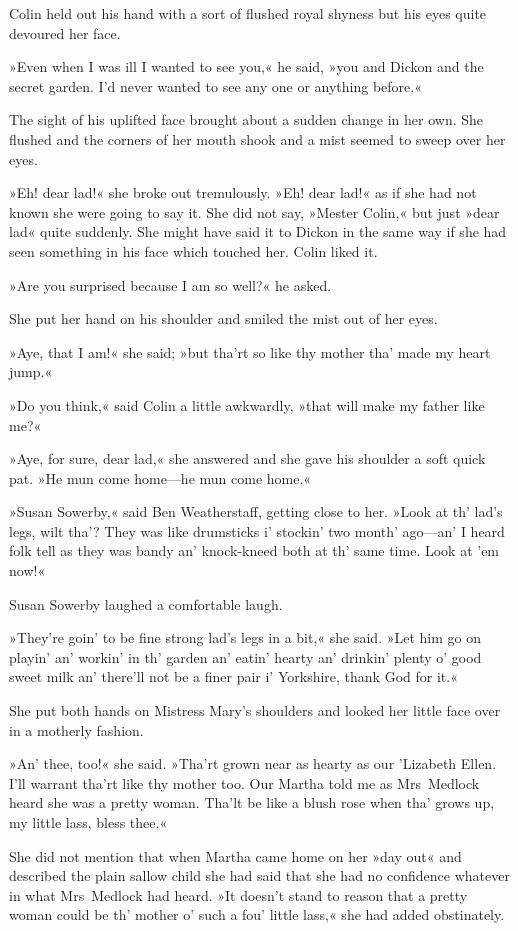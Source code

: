 Colin held out his hand with a sort of flushed royal shyness but his eyes quite devoured her face.

»Even when I was ill I wanted to see you,« he said, »you and Dickon and the secret garden. I'd never wanted to see any one or anything before.«

The sight of his uplifted face brought about a sudden change in her own. She flushed and the corners of her mouth shook and a mist seemed to sweep over her eyes.

»Eh! dear lad!« she broke out tremulously. »Eh! dear lad!« as if she had not known she were going to say it. She did not say, »Mester Colin,« but just »dear lad« quite suddenly. She might have said it to Dickon in the same way if she had seen something in his face which touched her. Colin liked it.

»Are you surprised because I am so well?« he asked.

She put her hand on his shoulder and smiled the mist out of her eyes.

»Aye, that I am!« she said; »but tha'rt so like thy mother tha' made my heart jump.«

»Do you think,« said Colin a little awkwardly, »that will make my father like me?«

»Aye, for sure, dear lad,« she answered and she gave his shoulder a soft quick pat. »He mun come home—he mun come home.«

»Susan Sowerby,« said Ben Weatherstaff, getting close to her. »Look at th' lad's legs, wilt tha'? They was like drumsticks i' stockin' two month' ago—an' I heard folk tell as they was bandy an' knock-kneed both at th' same time. Look at 'em now!«

Susan Sowerby laughed a comfortable laugh.

»They're goin' to be fine strong lad's legs in a bit,« she said. »Let him go on playin' an' workin' in th' garden an' eatin' hearty an' drinkin' plenty o' good sweet milk an' there'll not be a finer pair i' Yorkshire, thank God for it.«

She put both hands on Mistress Mary's shoulders and looked her little face over in a motherly fashion.

»An' thee, too!« she said. »Tha'rt grown near as hearty as our 'Lizabeth Ellen. I'll warrant tha'rt like thy mother too. Our Martha told me as Mrs~Medlock heard she was a pretty woman. Tha'lt be like a blush rose when tha' grows up, my little lass, bless thee.«

She did not mention that when Martha came home on her »day out« and described the plain sallow child she had said that she had no confidence whatever in what Mrs~Medlock had heard. »It doesn't stand to reason that a pretty woman could be th' mother o' such a fou' little lass,« she had added obstinately.

